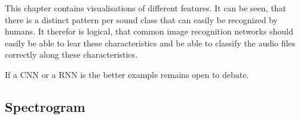 This chapter contains visualisations of different features. It can be seen, that there is a distinct pattern per sound class that can easily be recognized by humans. It therefor is logical, that common image recognition networks should easily be able to lear these characteristics and be able to classify the audio files correctly along these characteristics.

If a CNN or a RNN is the better example remains open to debate.




\subsection{Spectrogram}

